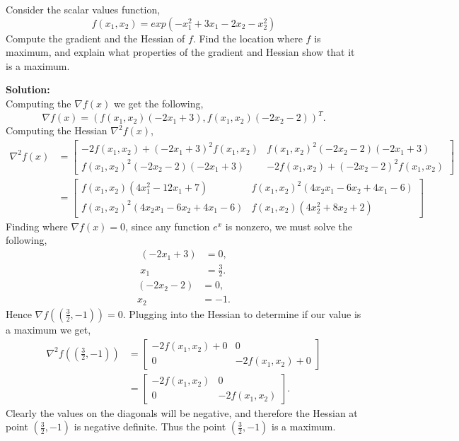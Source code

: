 \documentclass[12pt]{article}
\makeatletter
\theoremstyle{homework}
\newenvironment{exercise}[1]
{\def\@currentlabel{#1}\exercisecore}
{\endexercisecore}
\newcommand{\localhead}[1]{\par\smallskip\noindent\textbf{#1}\nobreak\\}%
\newcommand\solution{\localhead{Solution:}}
\makeatother
\begin{document}
\begin{exercise}{P6} Consider the scalar values function, 
  \begin{equation*}
    f(x_1, x_2) = exp(-x_1^2 + 3x_1 - 2x_2 - x_2^2)
  \end{equation*}
  Compute the gradient and the Hessian of $f$. Find the location where $f$ is maximum, and explain
  what properties of the gradient and Hessian show that it is a maximum.\\
  \solution Computing the $\nabla f(x)$ we get the following, 
  \begin{equation*}
    \nabla f(x) = (f(x_1, x_2)(-2x_1 + 3), f(x_1, x_2)(-2x_2 - 2))^T.
  \end{equation*}
  Computing the Hessian $\nabla^2f(x)$,
  \begin{align*}
    \nabla^2f(x) &= \begin{bmatrix}
      -2f(x_1, x_2) + (-2x_1 + 3)^2f(x_1, x_2) & f(x_1, x_2)^2(-2x_2 - 2)(-2x_1 + 3)\\
      f(x_1, x_2)^2(-2x_2 - 2)(-2x_1 + 3) & -2f(x_1, x_2) + (-2x_2 - 2)^2f(x_1, x_2)
    \end{bmatrix}\\
    &=\begin{bmatrix}
      f(x_1, x_2)(4x_1^2-12x_1+7) & f(x_1, x_2)^2(4x_2x_1-6x_2+4x_1-6)\\
      f(x_1, x_2)^2(4x_2x_1-6x_2+4x_1-6) & f(x_1, x_2)(4x_2^2+8x_2+2)
    \end{bmatrix}
  \end{align*}
  Finding where $\nabla f(x) = 0$, since any function $e^x$ is nonzero, we must solve the following, 
  \begin{align*}
    (-2x_1 + 3) &= 0,\\
    x_1 &= \frac{3}{2}.
  \end{align*}
  \begin{align*}
    (-2x_2 - 2) &= 0,\\
    x_2 &= -1.
  \end{align*}
  Hence $\nabla f((\frac{3}{2}, -1)) = 0$. Plugging into the Hessian to determine if our value is a maximum we get, 
  \begin{align*}
    \nabla^2f((\frac{3}{2}, -1)) &= \begin{bmatrix}
      -2f(x_1, x_2) + 0 & 0\\
      0 & -2f(x_1, x_2) + 0
    \end{bmatrix}\\
    &= \begin{bmatrix}
      -2f(x_1, x_2) & 0\\
      0 & -2f(x_1, x_2)
    \end{bmatrix}.
  \end{align*}
  Clearly the values on the diagonals will be negative, and therefore the Hessian at point $(\frac{3}{2}, -1)$ is negative definite. Thus the point $(\frac{3}{2}, -1)$ 
  is a maximum. 
\end{exercise}
\vspace*{.15in}
\end{document}
